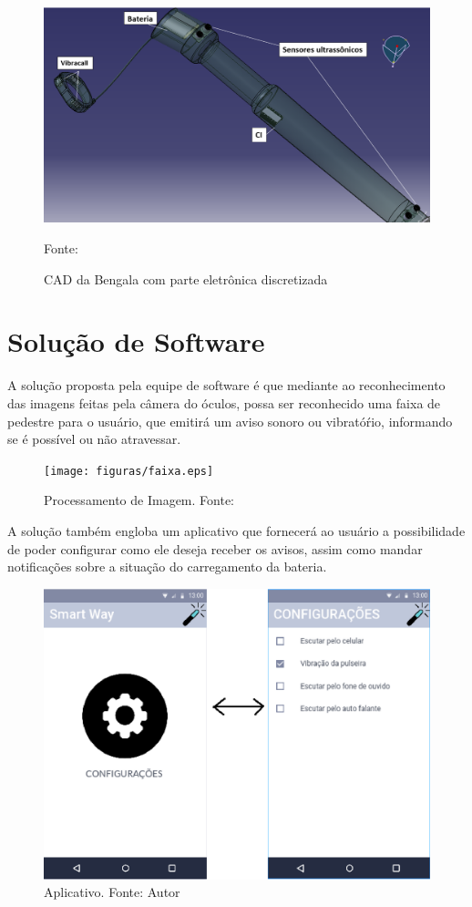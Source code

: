 \begin{figure}[H]
\includegraphics[scale=0.5]{figuras/bengala/eletronicacorreto.PNG}
\centering
\caption{CAD da Bengala com parte eletrônica discretizada}
\label{fig:sensor.jpg}
Fonte: \cite{sensor}
\end{figure}


\section{Solução de Software}

A solução proposta pela equipe de software é que mediante ao reconhecimento das imagens feitas pela câmera do óculos, possa ser reconhecido uma faixa de pedestre para o usuário, que emitirá um aviso sonoro ou vibratóŕio, informando se é possível ou não atravessar.

\begin{figure}[ht]
	\centering
    \texttt{[image: figuras/faixa.eps]}
    \caption[Processamento de Imagem.]{Processamento de Imagem. Fonte: \cite{faixa}}
	\label{fig:processamento}
\end{figure}

A solução também engloba um aplicativo que fornecerá ao usuário a possibilidade de poder configurar como ele deseja receber os avisos, assim como mandar notificações sobre a situação do carregamento da bateria.

\begin{figure}[ht]
	\centering
    \includegraphics[keepaspectratio=true,scale=0.8]{figuras/app.eps}
    \caption[Aplicativo.]{Aplicativo. Fonte: Autor}
	\label{fig:app}
\end{figure}